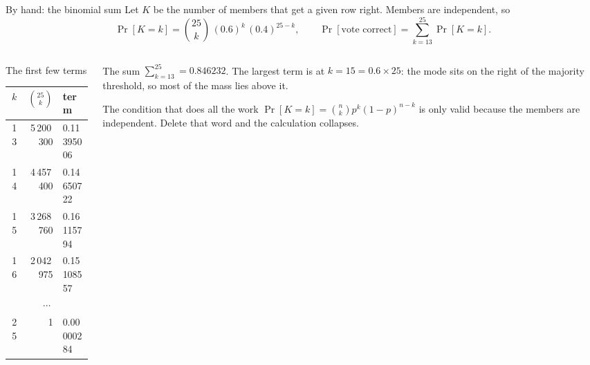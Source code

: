 \documentclass[aspectratio=169]{beamer}
\begin{document}
\begin{frame}[shrink=4]{By hand: the binomial sum}
  Let $K$ be the number of members that get a given row right. Members are
  independent, so
  \[
    \Pr[K = k] = \binom{25}{k}\,(0.6)^k\,(0.4)^{25-k},
    \qquad
    \Pr[\text{vote correct}] = \sum_{k=13}^{25}\Pr[K=k].
  \]
  \begin{columns}[T]
    \begin{column}{0.44\textwidth}
      \begin{block}{The first few terms}
        \small
        \begin{tabular}{rrl}
          \toprule
          $k$ & $\binom{25}{k}$ & term \\
          \midrule
          13 & 5\,200\,300 & 0.11395006 \\
          14 & 4\,457\,400 & 0.14650722 \\
          15 & 3\,268\,760 & 0.16115794 \\
          16 & 2\,042\,975 & 0.15108557 \\
          \multicolumn{3}{c}{$\cdots$} \\
          25 & 1 & 0.00000284 \\
          \bottomrule
        \end{tabular}
      \end{block}
    \end{column}
    \begin{column}{0.52\textwidth}
      \begin{exampleblock}{The sum}
        $\sum_{k=13}^{25} = \mathbf{0.846232}$. The largest term is at
        $k = 15 = 0.6 \times 25$: the mode sits on the right of the majority
        threshold, so most of the mass lies above it.
      \end{exampleblock}
      \begin{alertblock}{The condition that does all the work}
        $\Pr[K=k] = \binom{n}{k}p^k(1-p)^{n-k}$ is only valid because the
        members are independent. Delete that word and the calculation
        collapses.
      \end{alertblock}
    \end{column}
  \end{columns}
\end{frame}
\end{document}
